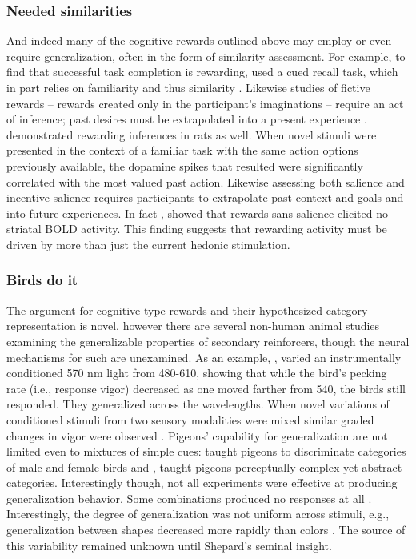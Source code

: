 \subsubsection{Needed similarities}
\label{subsub:needed}
And indeed many of the cognitive rewards outlined above may employ or even require generalization, often in the form of similarity assessment.  For example, to find that successful task completion is rewarding, \citet{Tricomi:2008p6663} used a cued recall task, which in part relies on familiarity \citep{Jacoby:1991p9096} and thus similarity \citep{Nosofsky:1988p9098}.  Likewise studies of fictive rewards -- rewards created only in the participant's imaginations -- require an act of inference; past desires must be extrapolated into a present experience \citep{Hayden:2009p6545,Lohrenz:2007p7240}. \citet{Roesch:2007p2519} demonstrated rewarding inferences in rats as well.  When novel stimuli were presented in the context of a familiar task with the same action options previously available, the dopamine spikes that resulted were significantly correlated with the most valued past action.  Likewise assessing both salience and incentive salience requires participants to extrapolate past context and goals and into future experiences.  In fact \citet{Zink:2004p5108}, showed that rewards sans salience elicited no striatal BOLD activity.  This finding suggests that rewarding activity must be driven by more than just the current hedonic stimulation.

\subsubsection{Birds do it}
\label{subsub:birds}
The argument for cognitive-type rewards and their hypothesized category representation is novel, however there are several non-human animal studies examining the generalizable properties of secondary reinforcers, though the neural mechanisms for such are unexamined.  As an example, \citet{Guttman:1956p8355}, varied an instrumentally conditioned 570 nm light from 480-610, showing that while the bird's pecking rate (i.e., response vigor) decreased as one moved farther from 540, the birds still responded.  They generalized across the wavelengths.  When novel variations of conditioned stimuli from two sensory modalities were mixed similar graded changes in vigor were observed  \citep{Guttman:1956p8355}.  Pigeons' capability for generalization are not limited even to mixtures of simple cues: \citet{Nakamura:2006p9093} taught pigeons to discriminate categories of male and female birds and \citet{Smith:2011p9101}, taught pigeons perceptually complex yet abstract categories.  Interestingly though, not all experiments were effective at producing generalization behavior.  Some combinations produced no responses at all \citep{Blough:2001p8408,Simmons:2008p8405,Urcuioli:2001p8359}.  Interestingly, the degree of generalization was not uniform across stimuli, e.g., generalization between shapes decreased more rapidly than colors \citep{Shepard:1987p9102}.  The source of this variability remained unknown until Shepard's seminal insight.

